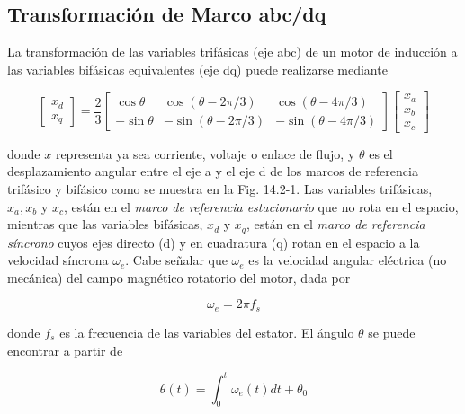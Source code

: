 \documentclass[letterpaper,12pt]{article}
\begin{document}
\subsection{Transformación de Marco abc/dq}

La transformación de las variables trifásicas (eje abc) de un motor de inducción a las variables bifásicas equivalentes (eje dq) puede realizarse mediante

\begin{equation}
\begin{bmatrix}
x_d \\
x_q
\end{bmatrix}
=
\frac{2}{3}
\begin{bmatrix}
\cos \theta & \cos(\theta - 2\pi/3) & \cos(\theta - 4\pi/3) \\
-\sin \theta & -\sin(\theta - 2\pi/3) & -\sin(\theta - 4\pi/3)
\end{bmatrix}
\begin{bmatrix}
x_a \\
x_b \\
x_c
\end{bmatrix} \tag{14.2-1}
\end{equation}

donde $x$ representa ya sea corriente, voltaje o enlace de flujo, y $\theta$ es el desplazamiento angular entre el eje a y el eje d de los marcos de referencia trifásico y bifásico como se muestra en la Fig. 14.2-1. Las variables trifásicas, $x_a, x_b$ y $x_c$, están en el \textit{marco de referencia estacionario} que no rota en el espacio, mientras que las variables bifásicas, $x_d$ y $x_q$, están en el \textit{marco de referencia síncrono} cuyos ejes directo (d) y en cuadratura (q) rotan en el espacio a la velocidad síncrona $\omega_e$. Cabe señalar que $\omega_e$ es la velocidad angular eléctrica (no mecánica) del campo magnético rotatorio del motor, dada por

\begin{equation}
\omega_e = 2 \pi f_s \tag{14.2-2}
\end{equation}

donde $f_s$ es la frecuencia de las variables del estator. El ángulo $\theta$ se puede encontrar a partir de

\begin{equation}
\theta(t) = \int_{0}^{t} \omega_e(t) dt + \theta_0 \tag{14.2-3}
\end{equation}
\end{document}
